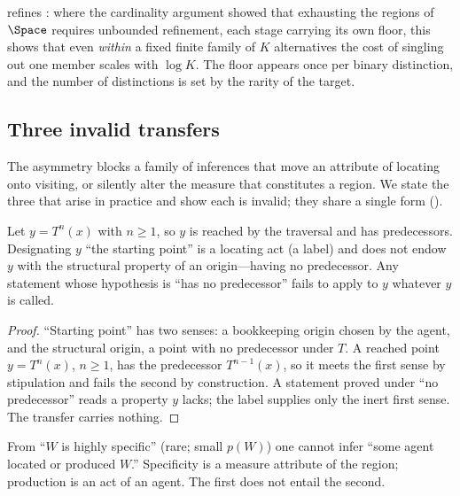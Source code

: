 \begin{remark}
\label{rem:consistent-card}
 refines : where the cardinality argument
showed that exhausting the regions of $\Space$ requires unbounded refinement, each
stage carrying its own floor, this shows that even \emph{within} a fixed finite
family of $K$ alternatives the cost of singling out one member scales with
$\log K$. The floor appears once per binary distinction, and the number of
distinctions is set by the rarity of the target.
\end{remark}

\subsection{Three invalid transfers}

The asymmetry blocks a family of inferences that move an attribute of locating
onto visiting, or silently alter the measure that constitutes a region. We state
the three that arise in practice and show each is invalid; they share a single
form ().

\begin{proposition}
\label{prop:rename}
Let $y=T^{n}(x)$ with $n\ge1$, so $y$ is reached by the traversal and has
predecessors. Designating $y$ ``the starting point'' is a locating act
\textup{(}a label\textup{)} and does not endow $y$ with the structural property
of an origin---having no predecessor. Any statement whose hypothesis is ``has no
predecessor'' fails to apply to $y$ whatever $y$ is called.
\end{proposition}

\begin{proof}
``Starting point'' has two senses: a bookkeeping origin chosen by the agent, and
the structural origin, a point with no predecessor under $T$. A reached point
$y=T^{n}(x)$, $n\ge1$, has the predecessor $T^{n-1}(x)$, so it meets the first
sense by stipulation and fails the second by construction. A statement proved
under ``no predecessor'' reads a property $y$ lacks; the label supplies only the
inert first sense. The transfer carries nothing.
\end{proof}

\begin{proposition}
\label{prop:arrange}
From ``$W$ is highly specific'' \textup{(}rare; small $p(W)$\textup{)} one cannot
infer ``some agent located or produced $W$.'' Specificity is a measure attribute
of the region; production is an act of an agent. The first does not entail the
second.
\end{proposition}

